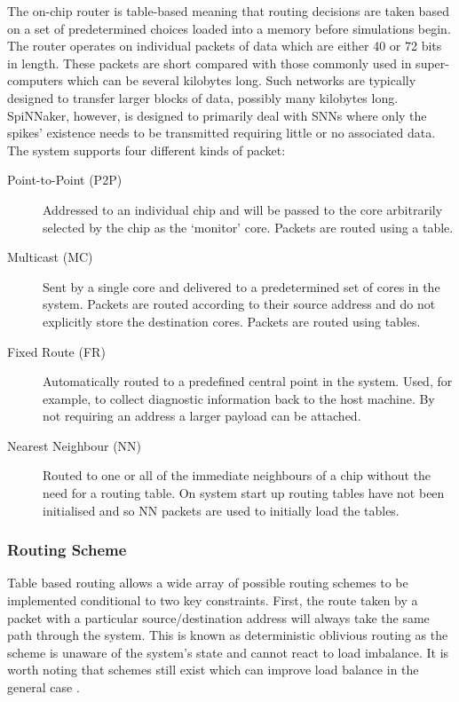 			The on-chip router is table-based meaning that routing decisions are taken
			based on a set of predetermined choices loaded into a memory before
			simulations begin. The router operates on individual packets of data which
			are either 40 or 72 bits in length. These packets are short compared with
			those commonly used in super-computers which can be several kilobytes
			long.  Such networks are typically designed to transfer larger blocks of
			data, possibly many kilobytes long. SpiNNaker, however, is designed to
			primarily deal with SNNs where only the spikes' existence needs to be
			transmitted requiring little or no associated data.  The system supports
			four different kinds of packet:
			
			\begin{description}
				
				\item[Point-to-Point (P2P)] Addressed to an individual chip and will be
				passed to the core arbitrarily selected by the chip as the `monitor'
				core. Packets are routed using a table.
				
				\item[Multicast (MC)] Sent by a single core and delivered to a
				predetermined set of cores in the system. Packets are routed according
				to their source address and do not explicitly store the destination
				cores. Packets are routed using tables.
				
				\item[Fixed Route (FR)] Automatically routed to a predefined central
				point in the system. Used, for example, to collect diagnostic
				information back to the host machine. By not requiring an address a
				larger payload can be attached.
				
				\item[Nearest Neighbour (NN)] Routed to one or all of the immediate
				neighbours of a chip without the need for a routing table. On system
				start up routing tables have not been initialised and so NN packets are
				used to initially load the tables.
				
			\end{description}
			
			\subsubsection{Routing Scheme}
				
				Table based routing allows a wide array of possible routing schemes to
				be implemented conditional to two key constraints. First, the route
				taken by a packet with a particular source/destination address will
				always take the same path through the system. This is known as
				deterministic oblivious routing as the scheme is unaware of the system's
				state and cannot react to load imbalance. It is worth noting that
				schemes still exist which can improve load balance in the general case
				\cite{singh02}.
				
